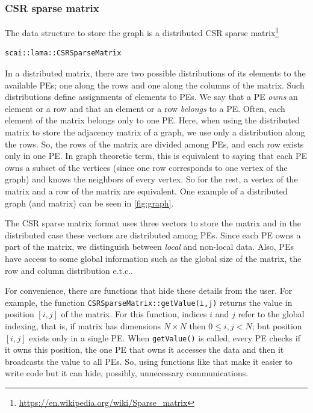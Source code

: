 \documentclass[a4paper,10pt]{article}
\newcommand{\etc}{e.t.c.}
\begin{document}
\subsubsection*{CSR sparse matrix}

The data structure to store the graph is a distributed CSR sparse matrix\footnote{\url{https://en.wikipedia.org/wiki/Sparse_matrix}} 
\begin{verbatim}
scai::lama::CSRSparseMatrix
\end{verbatim}

In a distributed matrix, there are two possible distributions of its elements to the available
PEs; one along the rows and one along the columns of the matrix.
Such distributions define assignments of elements to PEs. We say that a PE \emph{owns} 
an element or a row
and that an element or a row \emph{belongs} to a PE. Often, each element of the matrix 
belongs only to one PE.
Here, when using the distributed matrix to store the adjacency matrix of a graph, 
we use only a distribution along the rows. So, the rows of the matrix are divided among PEs,
and each row exists only in one PE.
In graph theoretic term, this is equivalent to saying that each PE owns a subset of 
the vertices (since
one row corresponds to one vertex of the graph) and knows the neighbors of every vertex. 
So for the rest, a vertex of the matrix and a row of the matrix are equivalent.
One example of a distributed graph (and matrix) can be seen in \cref{fig:graph}.

The CSR sparse matrix format uses three vectors to store the matrix and in the distributed case
these vectors are distributed among PEs. Since each PE owns a part of the matrix,
we distinguish between \emph{local} and non-local data. Also, PEs have access to some global information 
such as the global size of the matrix, the row and column distribution \etc. 

For convenience, there are functions that hide these details from the user.
For example, the function \texttt{CSRSparseMatrix::getValue(i,j)} returns the value 
in position $[i,j]$
of the matrix. For this function, indices $i$ and $j$ refer to the global indexing, 
that is, if matrix has dimensions
$N\times N$ then $0\leq i,j < N$; but position $[i,j]$ exists only in a single PE.
When \texttt{getValue()} is
called, every PE checks if it owns this position, the one PE that owns it accesses the data and 
then it broadcasts the value to all PEs. 
So, using functions like that make it easier to write code
but it can hide, possibly, unnecessary communications.
\end{document}
